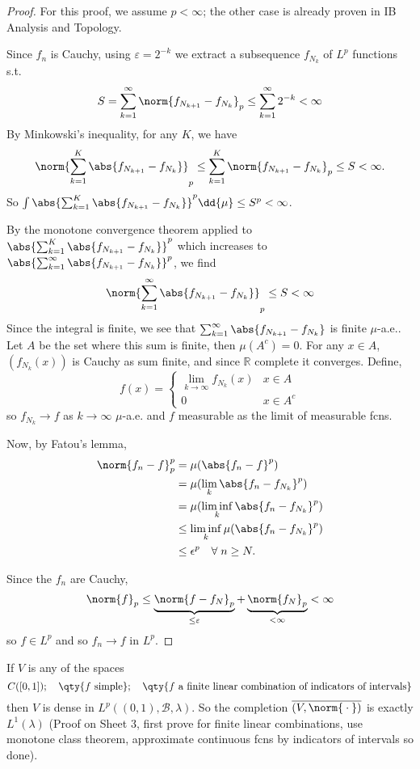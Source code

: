 \begin{proof}
	For this proof, we assume $p < \infty$; the other case is already proven in IB Analysis and Topology.

	Since $f_n$ is Cauchy, using $\varepsilon = 2^{-k}$ we extract a subsequence $f_{N_k}$ of $L^p$ functions s.t.
	\[ S = \sum_{k=1}^\infty \norm{f_{N_{k+1}} - f_{N_k}}_p \leq \sum_{k=1}^\infty 2^{-k} < \infty \]
	By Minkowski's inequality, for any $K$, we have
	\[ \norm{\sum_{k=1}^K \abs{f_{N_{k+1}} - f_{N_k}}}_p \leq \sum_{k=1}^K \norm{f_{N_{k+1}} - f_{N_k}}_p \leq S < \infty. \]
	So $\int \abs{\sum_{k=1}^K \abs{f_{N_{k+1}} - f_{N_k}}}^p \dd{\mu} \leq S^p < \infty$.

	By the monotone convergence theorem applied to $\abs{\sum_{k=1}^K \abs{f_{N_{k+1}} - f_{N_k}}}^p$ which increases to $\abs{\sum_{k=1}^\infty \abs{f_{N_{k+1}} - f_{N_k}}}^p$, we find
	\[ \norm{\sum_{k=1}^\infty \abs{f_{N_{k+1}} - f_{N_k}}}_p \leq S < \infty \]
	Since the integral is finite, we see that $\sum_{k=1}^\infty \abs{f_{N_{k+1}} - f_{N_k}}$ is finite $\mu$-a.e..
	Let $A$ be the set where this sum is finite, then $\mu(A^c) = 0$.
	For any $x \in A$, $(f_{N_k}(x))$ is Cauchy as sum finite, and since $\mathbb{R}$ complete it converges.
	Define,
	\[ f(x) = \begin{cases}
		\lim_{k \to \infty} f_{N_k}(x) & x \in A \\
		0 & x \in A^c
	\end{cases} \]
	so $f_{N_k} \to f$ as $k \to \infty$ $\mu$-a.e. and $f$ measurable as the limit of measurable fcns.

	Now, by Fatou's lemma,
	\begin{align*}
		\norm{f_n - f}_p^p &= \mu(\abs{f_n - f}^p) \\
		&= \mu(\lim_k \abs{f_n - f_{N_k}}^p) \\
		&= \mu(\liminf_k \abs{f_n - f_{N_k}}^p) \\
		&\leq \liminf_k \mu(\abs{f_n - f_{N_k}}^p) \\
		&\leq \epsilon^p \quad \forall \; n \geq N.
	\end{align*}

	Since the $f_n$ are Cauchy,
	\[ \norm{f}_p \leq \underbrace{\norm{f - f_N}_p}_{\leq \varepsilon} + \underbrace{\norm{f_N}_p}_{< \infty} < \infty \]
	so $f \in L^p$ and so $f_n \to f$ in $L^p$.
\end{proof}

\begin{remark}
	If $V$ is any of the spaces
	\[ C([0, 1]);\quad\qty{f \text{ simple}};\quad\qty{f \text{ a finite linear combination of indicators of intervals}} \]
	then $V$ is dense in $L^p((0, 1), \mathcal{B}, \lambda)$.
	So the completion $\overline{(V,\norm{\wildcard})}$ is exactly $L^1(\lambda)$ (Proof on Sheet 3, first prove for finite linear combinations, use monotone class theorem, approximate continuous fcns by indicators of intervals so done).
\end{remark}

